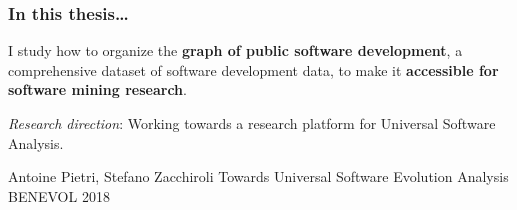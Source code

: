 \documentclass[aspectratio=169,xcolor=table]{beamer}
\begin{document}
    \begin{frame}
        \frametitle{In this thesis…}


        \begin{block}{}
            \Large
            I study how to organize the \textbf{graph of public software
            development}, a comprehensive dataset of software development data,
            to make it \textbf{accessible for software mining research}.
        \end{block}

        \begin{block}{}
            \emph{Research direction}: Working towards a research platform for
            Universal Software Analysis.

            \footnotesize
            \begin{thebibliography}{swhbenevol}
                 Antoine Pietri, Stefano Zacchiroli\newblock
                Towards Universal Software Evolution Analysis\newblock
                BENEVOL 2018\newblock
            \end{thebibliography}
        \end{block}
    \end{frame}




\end{document}
